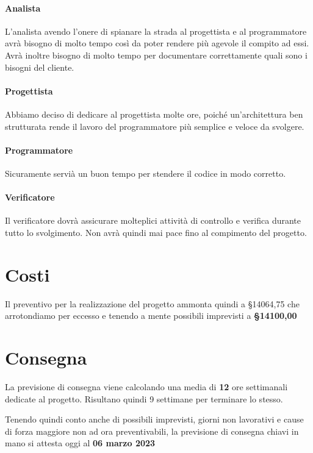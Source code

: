 \paragraph{Analista}L'analista avendo l'onere di spianare la strada al progettista e al programmatore avrà bisogno di molto tempo così da poter rendere più agevole il compito ad essi. Avrà inoltre bisogno di molto tempo per documentare correttamente quali sono i bisogni del cliente.

\paragraph{Progettista} Abbiamo deciso di dedicare al progettista molte ore, poiché un'architettura ben strutturata rende il lavoro del programmatore più semplice e veloce da svolgere.

\paragraph{Programmatore} Sicuramente servià un buon tempo per stendere il codice in modo corretto.

\paragraph{Verificatore} Il verificatore dovrà assicurare molteplici attività di controllo e verifica durante tutto lo svolgimento. Non avrà quindi mai pace fino al compimento del progetto.

\section{Costi}

Il preventivo per la realizzazione del progetto ammonta quindi a §14064,75 che arrotondiamo per eccesso e tenendo a mente possibili imprevisti a \textbf{§14100,00}

\section{Consegna}

La previsione di consegna viene calcolando una media di \textbf{12} ore settimanali dedicate al progetto. Risultano quindi 9 settimane per terminare lo stesso.

Tenendo quindi conto anche di possibili imprevisti, giorni non lavorativi e cause di forza maggiore non ad ora preventivabili, la previsione di consegna chiavi in mano si attesta oggi al \textbf{06 marzo 2023}

